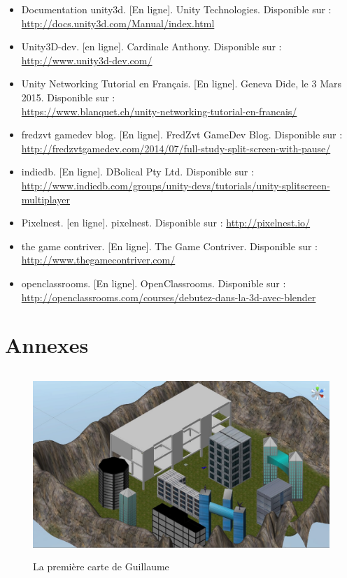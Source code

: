 \documentclass[12pt, titlepage]{article}
\begin{document}
\begin{spacing}{1.5}
\begin{itemize}
\item Documentation unity3d. [En ligne]. Unity Technologies. Disponible sur : \url{http://docs.unity3d.com/Manual/index.html}
\item Unity3D-dev. [en ligne]. Cardinale Anthony. Disponible sur : \url{http://www.unity3d-dev.com/}
\item Unity Networking Tutorial en Français. [En ligne]. Geneva Dide, le 3 Mars 2015. Disponible sur :\\ \url{https://www.blanquet.ch/unity-networking-tutorial-en-francais/}
\item fredzvt gamedev blog. [En ligne]. FredZvt GameDev Blog. Disponible sur : \url{http://fredzvtgamedev.com/2014/07/full-study-split-screen-with-pause/}
\item indiedb. [En ligne]. DBolical Pty Ltd. Disponible sur : \url{http://www.indiedb.com/groups/unity-devs/tutorials/unity-splitscreen-multiplayer}
\item Pixelnest. [en ligne]. pixelnest. Disponible sur : \url{http://pixelnest.io/}
\item the game contriver. [En ligne]. The Game Contriver. Disponible sur : \url{http://www.thegamecontriver.com/}
\item openclassrooms. [En ligne]. OpenClassrooms. Disponible sur : \url{http://openclassrooms.com/courses/debutez-dans-la-3d-avec-blender}
\end{itemize}

\newpage
\section{Annexes}

\begin{figure}[h]
\center
\includegraphics[height=7cm, width=12cm]{niveau_guillaume.jpg}
\caption{La première carte de Guillaume}
\end{figure}


\end{spacing}
\end{document}
